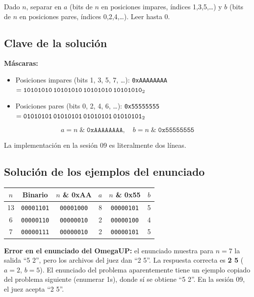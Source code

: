 \documentclass[12pt, oneside]{article}
\begin{document}
Dado $n$, separar en $a$ (bits de $n$ en posiciones impares, índices 1,3,5,\ldots)
y $b$ (bits de $n$ en posiciones pares, índices 0,2,4,\ldots).  Leer hasta 0.

\subsection{Clave de la solución}

\begin{notaprofesor}
  \textbf{Máscaras:}
  \begin{itemize}
    \item Posiciones impares (bits 1, 3, 5, 7, \ldots):
          \texttt{0xAAAAAAAA} $= \texttt{10101010\,10101010\,10101010\,10101010}_2$
    \item Posiciones pares (bits 0, 2, 4, 6, \ldots):
          \texttt{0x55555555} $= \texttt{01010101\,01010101\,01010101\,01010101}_2$
  \end{itemize}

  \[
    a = n \;\&\; \texttt{0xAAAAAAAA}, \quad b = n \;\&\; \texttt{0x55555555}
  \]

  La implementación en la sesión 09 es literalmente dos líneas.
\end{notaprofesor}

\subsection{Solución de los ejemplos del enunciado}

\begin{center}
\begin{tabular}{cccccc}
  \toprule
  $n$ & Binario & $n$ \& 0xAA & $a$ & $n$ \& 0x55 & $b$ \\
  \midrule
  13 & \texttt{00001101} & \texttt{00001000} & 8  & \texttt{00000101} & 5 \\
   6 & \texttt{00000110} & \texttt{00000010} & 2  & \texttt{00000100} & 4 \\
   7 & \texttt{00000111} & \texttt{00000010} & 2  & \texttt{00000101} & 5 \\
  \bottomrule
\end{tabular}
\end{center}

\begin{notaprofesor}
  \textbf{Error en el enunciado del OmegaUP:} el enunciado muestra para $n=7$
  la salida ``5 2'', pero los archivos del juez dan ``2 5''.  La respuesta
  correcta es \textbf{2 5} ($a=2$, $b=5$).  El enunciado del problema
  aparentemente tiene un ejemplo copiado del problema siguiente (enumerar 1s),
  donde sí se obtiene ``5 2''.  En la sesión 09, el juez acepta ``2 5''.
\end{notaprofesor}
\end{document}
